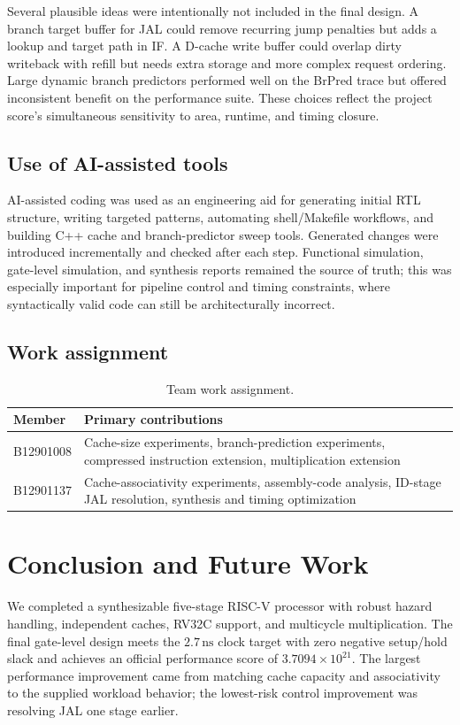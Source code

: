\documentclass[11pt,a4paper]{article}
\newcommand{\SI}[2]{\ensuremath{#1\,\mathrm{#2}}}
\begin{document}
Several plausible ideas were intentionally not included in the final design.
A branch target buffer for JAL could remove recurring jump penalties but adds a
lookup and target path in IF.  A D-cache write buffer could overlap dirty
writeback with refill but needs extra storage and more complex request ordering.
Large dynamic branch predictors performed well on the BrPred trace but offered
inconsistent benefit on the performance suite.  These choices reflect the
project score's simultaneous sensitivity to area, runtime, and timing closure.

\subsection{Use of AI-assisted tools}
AI-assisted coding was used as an engineering aid for generating initial RTL
structure, writing targeted patterns, automating shell/Makefile workflows, and
building C++ cache and branch-predictor sweep tools.  Generated changes were
introduced incrementally and checked after each step.  Functional simulation,
gate-level simulation, and synthesis reports remained the source of truth;
this was especially important for pipeline control and timing constraints,
where syntactically valid code can still be architecturally incorrect.

\subsection{Work assignment}
\begin{table}[h]
\centering
\caption{Team work assignment.}
\begin{tabularx}{\linewidth}{lX}
\toprule
Member & Primary contributions\\
\midrule
B12901008 & Cache-size experiments, branch-prediction experiments, compressed
instruction extension, multiplication extension\\
B12901137 & Cache-associativity experiments, assembly-code analysis,
ID-stage JAL resolution, synthesis and timing optimization\\
\bottomrule
\end{tabularx}
\end{table}

\section{Conclusion and Future Work}
We completed a synthesizable five-stage RISC-V processor with robust hazard
handling, independent caches, RV32C support, and multicycle multiplication.
The final gate-level design meets the \SI{2.7}{ns} clock target with zero
negative setup/hold slack and achieves an official performance score of
\(3.7094\times10^{21}\).  The largest performance improvement came from
matching cache capacity and associativity to the supplied workload behavior;
the lowest-risk control improvement was resolving JAL one stage earlier.
\end{document}
